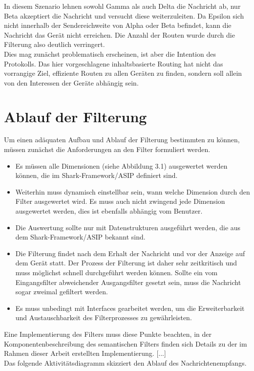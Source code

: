 In diesem Szenario lehnen sowohl Gamma als auch Delta die Nachricht ab, nur Beta akzeptiert die Nachricht und versucht diese weiterzuleiten. Da Epsilon sich nicht innerhalb der Sendereichweite von Alpha oder Beta befindet, kann die Nachricht das Gerät nicht erreichen. Die Anzahl der Routen wurde durch die Filterung also deutlich verringert. 
\\Dies mag zunächst problematisch erscheinen, ist aber die Intention des Protokolls. Das hier vorgeschlagene inhaltsbasierte Routing hat nicht das vorrangige Ziel, effiziente Routen zu allen Geräten zu finden, sondern soll allein von den Interessen der Geräte abhängig sein. 

\section{Ablauf der Filterung}
Um einen adäquaten Aufbau und Ablauf der Filterung bestimmten zu können, müssen zunächst die Anforderungen an den Filter formuliert werden.
\begin{itemize}
	\item Es müssen alle Dimensionen (siehe Abbildung 3.1) ausgewertet werden können, die im Shark-Framework/ASIP definiert sind.
	\item Weiterhin muss dynamisch einstellbar sein, wann welche Dimension durch den Filter ausgewertet wird. Es muss auch nicht zwingend jede Dimension ausgewertet werden, dies ist ebenfalls abhängig vom Benutzer.
	\item Die Auswertung sollte nur mit Datenstrukturen ausgeführt werden, die aus dem Shark-Framework/ASIP bekannt sind.
	\item Die Filterung findet nach dem Erhalt der Nachricht und vor der Anzeige auf dem Gerät statt. Der Prozess der Filterung ist daher sehr zeitkritisch und muss möglichst schnell durchgeführt werden können. Sollte ein vom Eingangsfilter abweichender Ausgangsfilter gesetzt sein, muss die Nachricht sogar zweimal gefiltert werden.
	\item Es muss unbedingt mit Interfaces gearbeitet werden, um die Erweiterbarkeit und Austauschbarkeit des Filterprozesses zu gewährleisten.
\end{itemize}
Eine Implementierung des Filters muss diese Punkte beachten, in der Komponentenbeschreibung des semantischen Filters finden sich Details zu der im Rahmen dieser Arbeit erstellten Implementierung. [...]
\\Das folgende Aktivitätsdiagramm skizziert den Ablauf des Nachrichtenempfangs.
